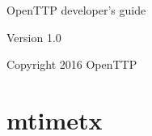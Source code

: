 \documentclass[11pt,a4paper,openany,oneside]{book}
\begin{document}
\begin{titlepage}

\begin{center}
{\Huge OpenTTP developer's guide}
\end{center}

\vspace*{4cm}
\begin{center}
Version 1.0
\end{center}

\begin{center}
Copyright 2016 OpenTTP
\end{center}

\end{titlepage}

\tableofcontents
\listoffigures
\listoftables



\chapter{mtimetx}


\end{document}
